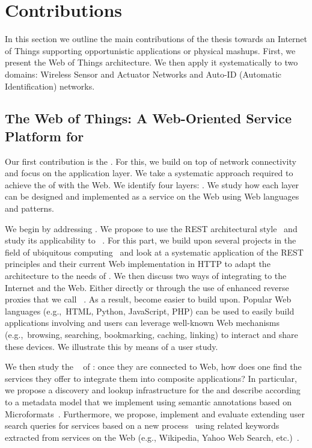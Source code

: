 \section{Contributions}
In this section we outline the main contributions of the thesis towards an Internet of Things supporting opportunistic applications or physical mashups. First, we present the Web of Things architecture. We then apply it systematically to two domains: Wireless Sensor and Actuator Networks and Auto-ID (Automatic Identification) networks.

\subsection{The Web of Things: A Web-Oriented Service Platform for \stsBig{}}
Our first contribution is the \WoTA{}. For this, we build on top of network connectivity and focus on the application layer. We take a systematic approach required to achieve the  of \sts{} with the Web. We identify four layers: . We study how each layer can be designed and implemented as a service on the Web using Web languages and patterns.

We begin by addressing . We propose to use the REST  architectural style~\cite{Fielding2000} and study its applicability to \sts{}~\cite{Guinard2010-WoT}. For this part, we build upon several projects in the field of ubiquitous computing~\cite{Kindberg2002,Drytkiewicz2004-pREST,Luckenbach2005} and look at a systematic application of the REST principles and their current Web implementation in HTTP to adapt the architecture to the needs of \sts{}. We then discuss two ways of integrating \sts{} to the Internet and the Web. Either directly or through the use of enhanced reverse proxies that we call \sgs{}~\cite{Trifa2009,Guinard2010-Search}. As a result, \sts{} become easier to build upon. Popular Web languages (e.g.,~HTML, Python, JavaScript, PHP) can be used to easily build applications involving \sts{} and users can leverage well-known Web mechanisms (e.g.,~browsing, searching, bookmarking, caching, linking) to interact and share these devices. We illustrate this by means of a user study.

We then study the ~\cite{Morville2005} of \sts{}: once they are connected to Web, how does one find the services they offer to integrate them into composite applications? In particular, we propose a discovery and lookup infrastructure for the \WoTLong{} and describe \sts{} according to a metadata model that we implement using semantic annotations based on Microformats~. Furthermore, we propose, implement and evaluate extending user search queries for \sts{} services based on a new process~\cite{GuinardPatent2010} using related keywords extracted from services on the Web (e.g., Wikipedia, Yahoo Web Search, etc.)~\cite{Guinard2010-Search}.

